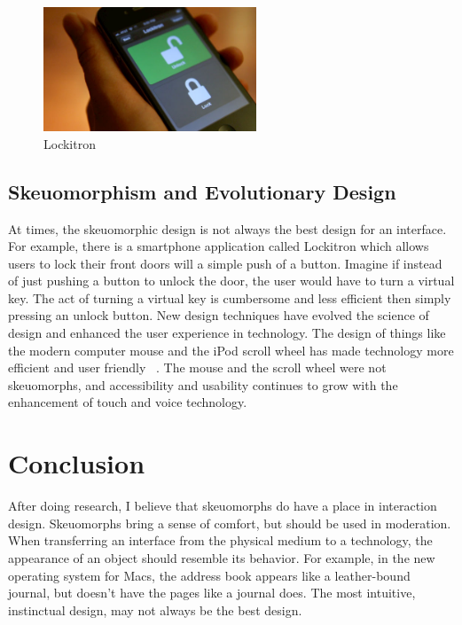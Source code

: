 \documentclass{article}
\begin{document}
\begin{figure}
\centering
\includegraphics[width=2.5in]{lockitron.jpeg} 

\caption{Lockitron}
\label{Lockitron Smartphone App}
\end{figure}
\subsection{Skeuomorphism and Evolutionary Design}

At times, the skeuomorphic design is not always the best design for an interface. For example, there is a smartphone application called Lockitron which allows users to lock their front doors will a simple push of a button. Imagine if instead of just pushing a button to unlock the door, the user would have to turn a virtual key. The act of turning a virtual key is cumbersome and less efficient then simply pressing an unlock button. New design techniques have evolved the science of design and enhanced the user experience in technology. The design of things like the modern computer mouse and the iPod scroll wheel has made technology more efficient and user friendly ~\cite{ipod}. The mouse and the scroll wheel were not skeuomorphs, and accessibility and usability continues to grow with the enhancement of touch and voice technology. 



\section{Conclusion}

	After doing research, I believe that skeuomorphs do have a place in interaction design. Skeuomorphs bring a sense of comfort, but should be used in moderation. When transferring an interface from the physical medium to a technology, the appearance of an object should resemble its behavior. For example, in the new operating system for Macs, the address book appears like a leather-bound journal, but doesn’t have the pages like a journal does. The most intuitive, instinctual design, may not always be the best design.
\pagebreak


\end{document}
